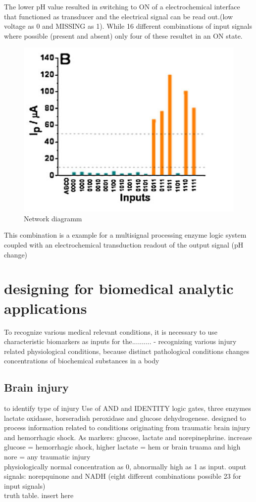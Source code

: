 \documentclass[runningheads]{llncs}
\begin{document}
		The lower pH value resulted in switching to ON of a electrochemical interface that functioned as transducer and the electrical signal can be read out.(low voltage as 0 and MISSING as 1). While 16 different combinations of input signals where possible (present and absent) only four of these resultet in an ON state.
		\begin{figure}[H] \centering \includegraphics[scale= 0.4]{pics/ph.png} \caption{Network diagramm} \label{img:ph} \end{figure}
	
	
		This combination is a example for a multisignal processing enzyme logic system coupled with an electrochemical transduction readout of the output signal (pH change)



\section{designing for biomedical analytic applications}
	To recognize various medical relevant conditions, it is necessary to use characteristic biomarkers as inputs for the.......... 
	- recognizing various injury related physiological conditions, because distinct pathological conditions changes concentrations of biochemical substances in a body 
	\subsection{Brain injury}
	to identify type of injury
	Use of AND and IDENTITY logic gates, three enzymes lactate oxidasse, horseradish peroxidase and glucose dehydrogenese. designed to process information related to conditions originating from traumatic brain injury and hemorrhagic shock.
	As markers: glucose, lactate and norepinephrine.
	increase glucose = hemorrhagic shock, higher lactate = hem or brain truama and high nore = any traumatic injury \\
	physiologically normal concentration as 0, abnormally high as 1 as input.
	ouput signals: norepquinone and NADH (eight different combinations possible 23 for input signals)\\
	truth table. insert here 
	
\end{document}
